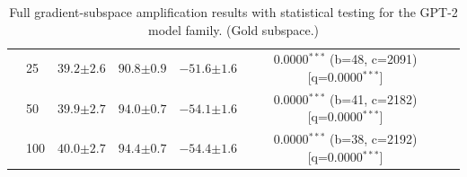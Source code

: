 \begin{table}[h!]
\begin{tabular}{l l cccc c}
 & 25 & $39.2 {\scriptstyle \pm 2.6}$ & $90.8 {\scriptstyle \pm 0.9}$ & $-51.6 {\scriptstyle \pm 1.6}$ & 0.0000$^{***}$ (b=48, c=2091) [q=0.0000$^{***}$] &  \\
 & 50 & $39.9 {\scriptstyle \pm 2.7}$ & $94.0 {\scriptstyle \pm 0.7}$ & $-54.1 {\scriptstyle \pm 1.6}$ & 0.0000$^{***}$ (b=41, c=2182) [q=0.0000$^{***}$] &  \\
 & 100 & $40.0 {\scriptstyle \pm 2.7}$ & $94.4 {\scriptstyle \pm 0.7}$ & $-54.4 {\scriptstyle \pm 1.6}$ & 0.0000$^{***}$ (b=38, c=2192) [q=0.0000$^{***}$] &  \\
\bottomrule
\end{tabular}
\caption{Full gradient-subspace amplification results with statistical testing for the GPT-2 model family. (Gold subspace.)}
\label{tab:gradsubspace_amp_stats_gold_gpt2}
\end{table}

